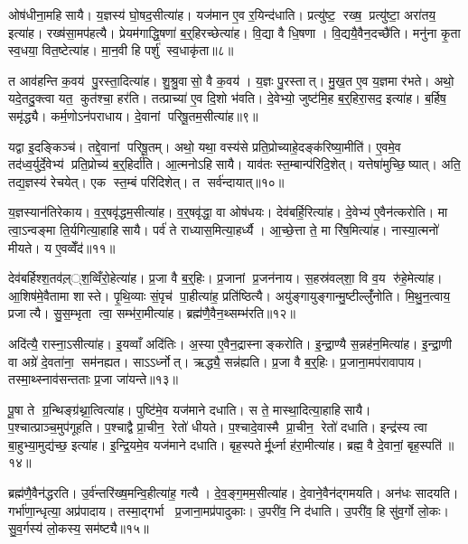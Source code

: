 ओष॑धीना॒महिसायै। य॒ज्ञस्य॑ घो॒षद॒सीत्या॑ह। यज॑मान ए॒व र॒यिन्द॑धाति। प्रत्यु॑ष्ट॒ रख्ष॒ प्रत्यु॑ष्टा॒ अरा॑तय॒ इत्या॑ह। रख्ष॑सा॒मप॑हत्यै। प्रेयम॑गाद्धि॒षणा॑ ब॒र्॒हिरच्छेत्या॑ह। वि॒द्या वै धि॒षणा। वि॒द्ययै॒वैन॒दच्छै॑ति। मनु॑ना कृ॒ता स्व॒धया॒ वित॒ष्टेत्या॑ह। मा॒न॒वी हि पर्\mbox{}शु॑ स्व॒धाकृ॑ता॥८॥

त आव॑हन्ति क॒वय॑ पु॒रस्ता॒दित्या॑ह। शु॒श्रु॒वासो॒ वै क॒वय॑। य॒ज्ञः पु॒रस्तात्। मु॒ख॒त ए॒व य॒ज्ञमा र॑भते। अथो॒ यदे॒तदु॒क्त्वा यत॒ कुत॑श्चा॒ हर॑ति। तत्प्राच्या॑ ए॒व दि॒शो भ॑वति। दे॒वेभ्यो॒ जुष्ट॑मि॒ह ब॒र्॒हिरा॒सद॒ इत्या॑ह। ब॒र्\mbox{}हिष॒ समृ॑द्ध्यै। कर्म॒णोऽन॑पराधाय। दे॒वानां परिषू॒तम॒सीत्या॑ह॥९॥

यद्वा इ॒दङ्किञ्च॑। तद्दे॒वानां परिषू॒तम्। अथो॒ यथा॒ वस्य॑से प्रति॒प्रोच्याहे॒दङ्क॑रिष्या॒मीति॑। ए॒वमे॒व तद॑ध्व॒र्युर्दे॒वेभ्य॑ प्रति॒प्रोच्य॑ ब॒र्॒हिर्दा॑ति। आ॒त्मनोऽहिसायै। याव॑तः स्त॒म्बान्प॑रिदि॒शेत्। यत्तेषा॑मुच्छि॒ष्यात्। अति॒ तद्य॒ज्ञस्य॑ रेचयेत्। एक स्त॒म्बं परि॑दिशेत्। त सर्व॑न्दायात्॥१०॥

य॒ज्ञस्यान॑तिरेकाय। व॒र्॒षवृ॑द्धम॒सीत्या॑ह। व॒र्॒षवृ॑द्धा॒ वा ओष॑धयः। देव॑बर्\mbox{}हि॒रित्या॑ह। दे॒वेभ्य॑ ए॒वैन॑त्करोति। मा त्वा॒ऽन्वङ्मा ति॒र्यगित्या॒हाहिसायै। पर्व॑ ते राध्यास॒मित्या॒हर्ध्यै। आ॒च्छे॒त्ता ते॒ मा रि॑ष॒मित्या॑ह। नास्या॒त्मनो॑ मीयते। य ए॒वव्वेँद॑॥११॥

देव॑बर्\mbox{}हिश्श॒तव॑ल़््श॒व्विँरो॒हेत्या॑ह। प्र॒जा वै ब॒र्॒हिः। प्र॒जानां प्र॒जन॑नाय। स॒हस्र॑वल्‌शा॒ वि व॒य रु॑हे॒मेत्या॑ह। आ॒शिष॑मे॒वैतामा शास्ते। पृ॒थि॒व्याः सं॒पृच॑ पा॒हीत्या॑ह॒ प्रति॑ष्ठित्यै। अयु॑ङ्गायुङ्गान्मु॒ष्टील्लुँ॑नोति। मि॒थु॒न॒त्वाय॒ प्रजात्यै। सु॒स॒म्भृता त्वा॒ सम्भ॑रा॒मीत्या॑ह। ब्रह्म॑णै॒वैन॒थ्सम्भ॑रति॥१२॥

अदि॑त्यै॒ रास्ना॒ऽसीत्या॑ह। इ॒यव्वाँ अदि॑तिः। अ॒स्या ए॒वैन॒द्रास्नाङ्करोति। इ॒न्द्रा॒ण्यै स॒न्नह॑न॒मित्या॑ह। इ॒न्द्रा॒णी वा अग्रे॑ दे॒वता॑ना॒ सम॑नह्यत। साऽऽर्ध्नोत्। ऋद्ध्यै॒ सन्न॑ह्यति। प्र॒जा वै ब॒र्॒हिः। प्र॒जाना॒मप॑रावापाय। तस्मा॒थ्स्नाव॑सन्तताः प्र॒जा जा॑यन्ते॥१३॥

पू॒षा ते ग्र॒न्थिङ्ग्र॑थ्ना॒त्वित्या॑ह। पुष्टि॑मे॒व यज॑माने दधाति। स ते॒ मास्था॒दित्या॒हाहिसायै। प॒श्चात्प्राञ्च॒मुप॑गूहति। प॒श्चाद्वै प्रा॒चीन॒ रेतो॑ धीयते। प॒श्चादे॒वास्मै प्रा॒चीन॒ रेतो॑ दधाति। इन्द्र॑स्य त्वा बा॒हुभ्या॒मुद्य॑च्छ॒ इत्या॑ह। इ॒न्द्रि॒यमे॒व यज॑माने दधाति। बृह॒स्पतेर्मू॒र्ध्ना ह॑रा॒मीत्या॑ह। ब्रह्म॒ वै दे॒वानां॒ बृह॒स्पति॑॥१४॥

ब्रह्म॑णै॒वैन॑द्धरति। उ॒र्व॑न्तरि॑ख्ष॒मन्वि॒हीत्या॑ह॒ गत्यै। दे॒व॒ङ्ग॒मम॒सीत्या॑ह। दे॒वाने॒वैन॑द्गमयति। अन॑धः सादयति। गर्भा॑णा॒न्धृत्या॒ अप्र॑पादाय। तस्मा॒द्गर्भा प्र॒जाना॒मप्र॑पादुकाः। उ॒परी॑व॒ नि द॑धाति। उ॒परी॑व॒ हि सु॑व॒र्गो लो॒कः। सु॒व॒र्गस्य॑ लो॒कस्य॒ सम॑ष्ट्यै॥१५॥\anuvakamend[स॒यो॒नि॒त्वाय॑ स्व॒धाकृ॑ता॒ऽसीत्या॑ह दाया॒द्वेद॑ भरति जायन्ते॒ बृह॒स्पति॒ सम॑ष्ट्यै]

